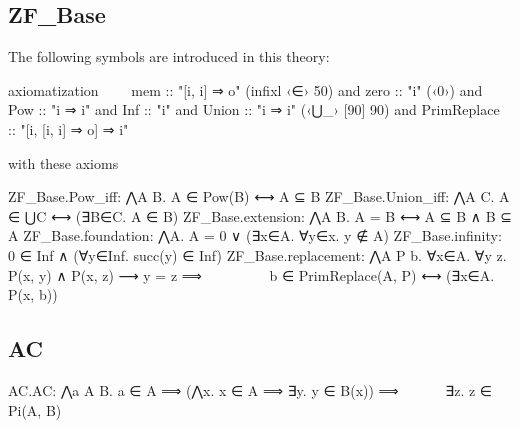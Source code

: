 \subsection{ZF\_Base}
The following symbols are introduced in this theory:
\begin{isabelle}
axiomatization\isanewline
\ \ \ \      mem :: "[i, i] ⇒ o"  (infixl ‹∈› 50)  \isanewline
  and zero :: "i"  (‹0›)  \isanewline
  and Pow :: "i ⇒ i"  \isanewline
  and Inf :: "i"  \isanewline
  and Union :: "i ⇒ i"  (‹⋃\_› [90] 90)\isanewline
  and PrimReplace :: "[i, [i, i] ⇒ o] ⇒ i"
\end{isabelle}
\noindent with these axioms
\begin{isabelle}
ZF\_Base.Pow\_iff: ⋀A B. A ∈ Pow(B) ⟷ A ⊆ B\isanewline
ZF\_Base.Union\_iff: ⋀A C. A ∈ ⋃C ⟷ (∃B∈C. A ∈ B)\isanewline
ZF\_Base.extension: ⋀A B. A = B ⟷ A ⊆ B ∧ B ⊆ A\isanewline
ZF\_Base.foundation: ⋀A. A = 0 ∨ (∃x∈A. ∀y∈x. y ∉ A)\isanewline
ZF\_Base.infinity: 0 ∈ Inf ∧ (∀y∈Inf. succ(y) ∈ Inf)\isanewline
ZF\_Base.replacement: ⋀A P b. ∀x∈A. ∀y z. P(x, y) ∧ P(x, z) ⟶ y = z ⟹ \isanewline
\ \ \ \ \ \ \ \ \ b ∈ PrimReplace(A, P) ⟷ (∃x∈A. P(x, b))
\end{isabelle}

\subsection{AC}
\begin{isabelle}
AC.AC: ⋀a A B. a ∈ A ⟹ (⋀x. x ∈ A ⟹ ∃y. y ∈ B(x)) ⟹\isanewline
  \ \ \ \ \ \ ∃z. z ∈ Pi(A, B)
\end{isabelle}

